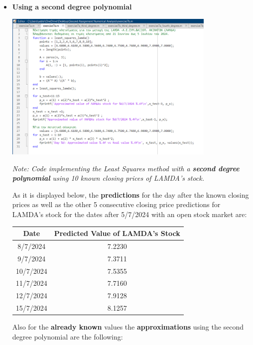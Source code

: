 \documentclass{article}
\begin{document}
\begin{itemize}
    \item \textbf{Using a second degree polynomial }

\begin{tcolorbox}[colback=red!10, colframe=gray!80, width=\textwidth, sharp corners]
    \centering 
    \includegraphics[width=0.8\textwidth,height=0.38\textheight]{Exercise7bSecond.png} 

    \vspace{0.1cm}
    \small\textit{Note: Code implementing the Least Squares method with a \textbf{second degree polynomial} using 10 known closing prices of LAMDA's stock. }
\end{tcolorbox}

    As it is displayed below, the \textbf{predictions} for the day after the known closing prices as well as the other 5 consecutive closing price predictions for LAMDA's stock for the dates after 5/7/2024 with an open stock market are:
    \begin{center}
    \begin{tabular}{|c|c|}
        \hline
        \textbf{Date} & \textbf{Predicted Value of LAMDA's Stock} \\
        \hline
        8/7/2024 & 7.2230 \\
        9/7/2024 & 7.3711 \\
        10/7/2024 & 7.5355 \\
        11/7/2024 & 7.7160 \\
        12/7/2024 & 7.9128 \\
        15/7/2024 & 8.1257 \\
        \hline
    \end{tabular}
\end{center}

Also for the \textbf{already known} values the \textbf{approximations} using the second degree polynomial are the following:
\begin{center}
    

\end{center}
\end{itemize}
\end{document}
